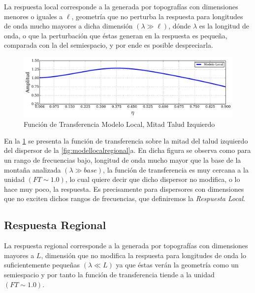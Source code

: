 \documentclass[spanish,letterpaper,12pt,twoside,openany]{article}
\begin{document}
La respuesta local corresponde a la generada por topografías con dimensiones menores o iguales a $\ell$, geometría que no perturba la respuesta para longitudes de onda mucho mayores a dicha dimensión $\left( \lambda \gg \ell \right)$, dónde $\lambda$ es la longitud de onda, o que la perturbación que éstas generan en la respuesta es pequeña, comparada con la del semiespacio, y por ende es posible despreciarla.

\begin{figure}[H]
	\centering
	\includegraphics[width=15.5 cm]{img/LocalResponse.pdf}
	\vspace{-1 cm}	
	\caption{Función de Transferencia Modelo Local, Mitad Talud Izquierdo}
	\label{fig:localresponse}
	\vspace{-.5 cm}
\end{figure}

En la \cref{fig:localresponse} se presenta la función de transferencia sobre la mitad del talud izquierdo del dispersor de la \cref{fig:modellocalregional}a. En dicha figura se observa como para un rango de frecuencias bajo, longitud de onda mucho mayor que la base de la montaña analizada $\left( \lambda \gg base \right)$, la función de transferencia es muy cercana a la unidad $\left( FT\sim 1.0 \right)$, lo cual quiere decir que dicho dispersor no modifica, o lo hace muy poco, la respuesta. Es precisamente para dispersores con dimensiones que no exciten dichos rangos de frecuencias, que definiremos la \textit{Respuesta Local}.

\subsection{Respuesta Regional}

La respuesta regional corresponde a la generada por topografías con dimensiones mayores a $L$, dimensión que no modifica la respuesta para longitudes de onda lo suficientemente pequeñas $\left( \lambda \ll L \right)$ ya que éstas verán la geometría como un semiespacio y por tanto la función de transferencia tiende a la unidad $\left( FT \sim 1.0 \right)$.
\end{document}
